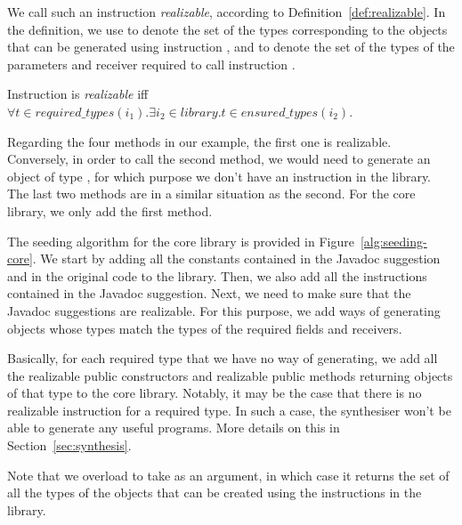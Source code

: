 \documentclass[runningheads,a4paper]{llncs}
\begin{document}
We call such an instruction {\em realizable}, according to Definition~\ref{def:realizable}.
In the definition, we use  to denote the set of the types corresponding to the objects that can be
generated using instruction , and  to denote
the set of the types of the parameters and receiver required to call instruction .


\begin{definition}\label{def:realizable}
Instruction  is {\em realizable} iff $\forall t \in required\_types(i_1). \exists i_2 \in library. t \in ensured\_types(i_2)$.
  
\end{definition}

Regarding the four methods in our example, the first one is realizable. Conversely, in order to call the second method, we would need to generate an object of type ,
for which purpose we don't have an instruction in the library.
The last two methods are in a similar situation as the second. For the core library, we only add the first method.


The seeding algorithm for the core library is provided in Figure~\ref{alg:seeding-core}.
We start by adding all the constants contained in the Javadoc suggestion
and in the original code to the library. Then, we also add all the instructions contained
in the Javadoc suggestion. Next, we need to make sure that the Javadoc suggestions
are realizable. For this purpose, we add ways of generating
objects whose types match the types of the required fields and receivers.

Basically, for each required type that we have no way of generating, we add all the realizable
public constructors and realizable public methods returning objects of that type to the
core library.
Notably, it may be the case that there is no realizable instruction for a required type.
In such a case, the synthesiser won't be able to generate any useful programs.
More details on this in Section~\ref{sec:synthesis}.

Note that we overload  to take  as an argument, in which case it returns the set of all the types of the objects that can be created using the instructions in the library.
\end{document}
